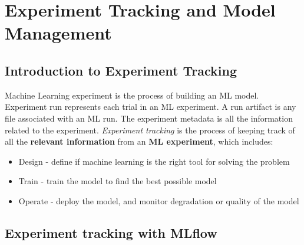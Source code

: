 \documentclass[letterpaper,12pt,notitlepage,twoside]{report}
\begin{document}
\chapter{Experiment Tracking and Model Management} \label{ch:2}
\section{Introduction to Experiment Tracking}
Machine Learning experiment is the process of building an ML model. Experiment run represents each trial in an ML experiment. A run artifact is any file associated with an ML run. The experiment metadata is all the information related to the experiment. \emph{Experiment tracking} is the process of keeping track of all the \textbf{relevant information} from an \textbf{ML experiment}, which includes:
\begin{itemize}[noitemsep, topsep=0pt]
	\item Design - define if machine learning is the right tool for solving the problem
	\item Train - train the model to find the best possible model
	\item Operate - deploy the model,  and monitor degradation or quality of the model
\end{itemize}
\section{Experiment tracking with MLflow}
\end{document}
